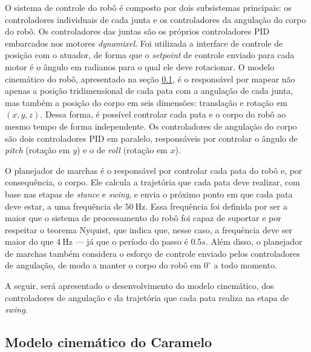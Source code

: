 \documentclass[conference]{IEEEtran}
\begin{document}
O sistema de controle do robô é composto por dois subsistemas principais: os controladores individuais de cada junta e os controladores da angulação do corpo do robô. Os controladores das juntas são os próprios controladores PID embarcados nos motores \textit{dynamixel}. Foi utilizada a interface de controle de posição com o atuador, de forma que o \textit{setpoint} de controle enviado para cada motor é o ângulo em radianos para o qual ele deve rotacionar. O modelo cinemático do robô, apresentado na seção \ref{sec:detail_inv_kinematics}, é o responsável por mapear não apenas a posição tridimensional de cada pata com a angulação de cada junta, mas também a posição do corpo em seis dimensões: translação e rotação em $(x, y, z)$. Dessa forma, é possível controlar cada pata e o corpo do robô ao mesmo tempo de forma independente. Os controladores de angulação do corpo são dois controladores PID em paralelo, responsáveis por controlar o ângulo de \textit{pitch} (rotação em $y$) e o de \textit{roll} (rotação em $x$).

O planejador de marchas é o responsável por controlar cada pata do robô e, por consequência, o corpo. Ele calcula a trajetória que cada pata deve realizar, com base nas etapas de \textit{stance} e \textit{swing}, e envia o próximo ponto em que cada pata deve estar, a uma frequência de $\SI{50}{\hertz}$. Essa frequência foi definida por ser a maior que o sistema de processamento do robô foi capaz de suportar e por respeitar o teorema Nyquist, que indica que, nesse caso, a frequência deve ser maior do que $\SI{4}{\hertz}$ --- já que o período do passo é $0.5 s$. Além disso, o planejador de marchas também considera o esforço de controle enviado pelos controladores de angulação, de modo a manter o corpo do robô em $0^{\circ}$ a todo momento.

A seguir, será apresentado o desenvolvimento do modelo cinemático, dos controladores de angulação e da trajetória que cada pata realiza na etapa de \textit{swing}.

\subsection{Modelo cinemático do Caramelo}
\label{sec:detail_inv_kinematics}
\end{document}
